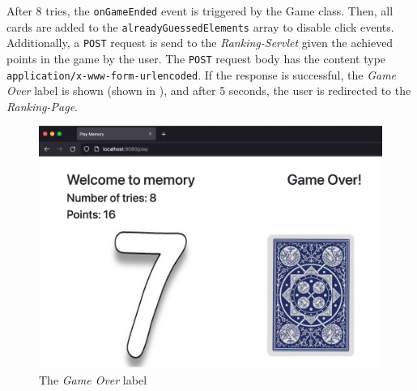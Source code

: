 After 8 tries, the \texttt{onGameEnded} event is triggered by the Game class. Then, all cards are added to the \texttt{alreadyGuessedElements} array to disable click events. Additionally, a \texttt{POST} request is send to the \textit{Ranking-Servlet} given the achieved points in the game by the user. The \texttt{POST} request body has the content type \texttt{application/x-www-form-urlencoded}. If the response is successful, the \textit{Game Over} label is shown (shown in ), and after 5 seconds, the user is redirected to the \textit{Ranking-Page}.
\begin{figure}[h]
\centering
\includegraphics[scale=0.2]{images/03_impl/frontend/game-over}
\caption{The \textit{Game Over} label}
\label{fig:03_impl_frontend_memGame_gameOver}
\end{figure}
